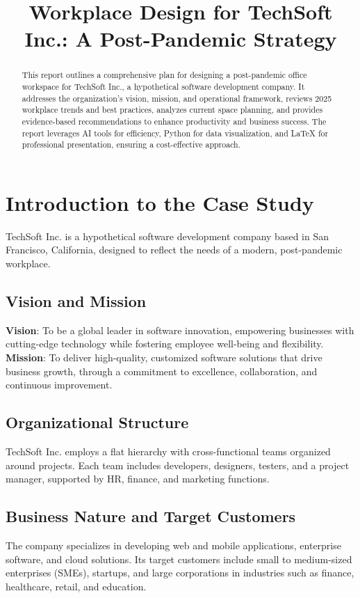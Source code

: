 \documentclass[12pt]{article}
\begin{document}
\title{Workplace Design for TechSoft Inc.: A Post-Pandemic Strategy}
\author{}
\date{}
\maketitle

\begin{abstract}
This report outlines a comprehensive plan for designing a post-pandemic office workspace for TechSoft Inc., a hypothetical software development company. It addresses the organization's vision, mission, and operational framework, reviews 2025 workplace trends and best practices, analyzes current space planning, and provides evidence-based recommendations to enhance productivity and business success. The report leverages AI tools for efficiency, Python for data visualization, and LaTeX for professional presentation, ensuring a cost-effective approach.
\end{abstract}

\section{Introduction to the Case Study}
TechSoft Inc. is a hypothetical software development company based in San Francisco, California, designed to reflect the needs of a modern, post-pandemic workplace.

\subsection{Vision and Mission}
\textbf{Vision}: To be a global leader in software innovation, empowering businesses with cutting-edge technology while fostering employee well-being and flexibility.\\
\textbf{Mission}: To deliver high-quality, customized software solutions that drive business growth, through a commitment to excellence, collaboration, and continuous improvement.

\subsection{Organizational Structure}
TechSoft Inc. employs a flat hierarchy with cross-functional teams organized around projects. Each team includes developers, designers, testers, and a project manager, supported by HR, finance, and marketing functions.

\subsection{Business Nature and Target Customers}
The company specializes in developing web and mobile applications, enterprise software, and cloud solutions. Its target customers include small to medium-sized enterprises (SMEs), startups, and large corporations in industries such as finance, healthcare, retail, and education.
\end{document}
